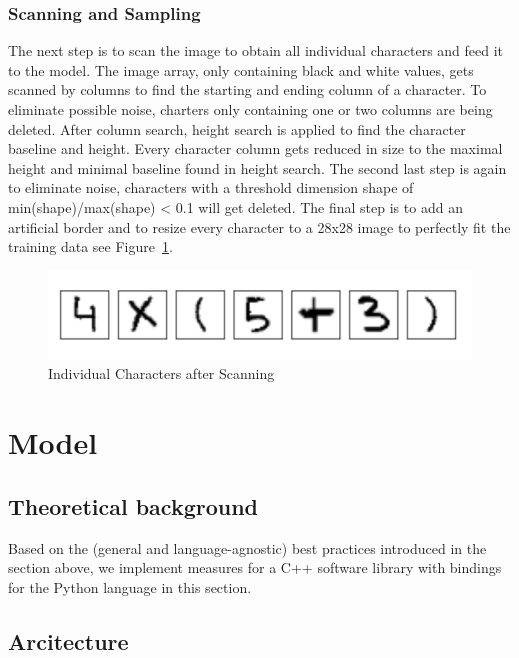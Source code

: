 \documentclass[@CLASSOPTIONS@]{tumarticle}
\begin{document}
\subsubsection{Scanning and Sampling}

The next step is to scan the image to obtain all individual characters and feed it to the model.
The image array, only containing black and white values, gets scanned by columns to find the starting
and ending column of a character.
To eliminate possible noise, charters only containing one or two columns are being deleted.
After column search, height search is applied to find the character baseline and height.
Every character column gets reduced in size to the maximal height and minimal baseline found in height search.
The second last step is again to eliminate noise, characters with a threshold dimension shape of
min(shape)/max(shape) < 0.1 will get deleted.
The final step is to add an artificial border and to resize every character to a 28x28 image to
perfectly fit the training data see Figure~\ref{Fig:Data6}.

\begin{figure}
    \begin{minipage}{0.48\textwidth}
     \centering
     \includegraphics[width=.9\linewidth]{figures/real_data_3}
     \caption{Individual Characters after Scanning}\label{Fig:Data6}
   \end{minipage}
\end{figure}

\section{Model}
\label{sec:implementation}

\subsection{Theoretical background}
Based on the (general and language-agnostic) best practices introduced in
the section above, we implement measures for a C++ software library with
bindings for the Python language in this section.

\subsection{Arcitecture}
\end{document}
